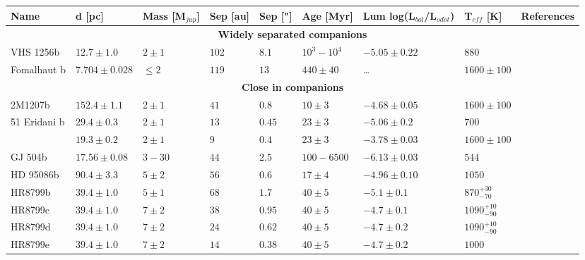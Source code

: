 \begin{landscape}
\begin{table}[t]
	\centering
	\begin{small}
	\begin{tabular}{lllllllll}
		\toprule
		\textbf{Name} & \textbf{d [pc]} & \textbf{Mass [M$_{jup}$]} & \textbf{Sep [au]} & \textbf{Sep ["]} & \textbf{Age [Myr]} & \textbf{Lum log(L$_{bol}$/L$_{odot}$)} & \textbf{T$_{eff}$ [K]} & \textbf{References}\\
		\midrule
		\multicolumn{9}{c}{\textbf{Widely separated companions}}\\
		\midrule
		VHS 1256b & $12.7\pm1.0$  & $2\pm1$     & $102$ & $8.1$ & $10^{3}-10^{4}$ & $-5.05\pm0.22$ & $880$ & \parencite{Gauza2015}\\
		Fomalhaut b & $7.704\pm0.028$ & $\leq 2$ & $119$ & $13$ & $440\pm40$ & \ldots & $1600\pm100$ &\\
		\midrule
		\multicolumn{9}{c}{\textbf{Close in companions}}\\
		\midrule
		2M1207b   & $152.4\pm1.1$ & $2\pm1$     & $41$ & $0.8$ & $10\pm3$ & $-4.68\pm0.05$ & $1600\pm100$ &\\
		51 Eridani b & $29.4\pm0.3$ & $2\pm1$   & $13$ & $0.45$ & $23\pm3$ & $-5.06\pm0.2$ & $700$ &  \parencite{Macintosh2015}\\
		\bpic     & $19.3\pm0.2$  & $2\pm1$     & $9$ & $0.4$ & $23\pm3$ & $-3.78\pm0.03$ & $1600\pm100$ & \parencite{Quanz2010}\\
		GJ 504b   & $17.56\pm0.08$  & $3-30$    & $44$ & $2.5$ & $100-6500$ & $-6.13\pm0.03$ & $544$ & \parencite{Skemer2016}\\
		HD 95086b & $90.4\pm3.3$  & $5\pm2$     & $56$ & $0.6$ & $17\pm4$ & $-4.96\pm0.10$ & $1050$  &\parencite{DeRosa2016}\\	
		HR8799b   & $39.4\pm1.0$  & $5\pm1$     & $68$ & $1.7$ & $40\pm5$ & $-5.1\pm0.1$ & $870^{+30}_{-70}$ & \parencite{Marois2008,Skemer2012}\\
		HR8799c   & $39.4\pm1.0$  & $7\pm2$     & $38$ & $0.95$ & $40\pm5$ & $-4.7\pm0.1$ & $1090^{+10}_{-90}$ &\parencite{Marois2008,Skemer2012}\\
		HR8799d   & $39.4\pm1.0$  & $7\pm2$     & $24$ & $0.62$ & $40\pm5$ & $-4.7\pm0.2$ & $1090^{+10}_{-90}$ &\parencite{Marois2008,Skemer2012}\\
		HR8799e   & $39.4\pm1.0$  & $7\pm2$     & $14$ & $0.38$ & $40\pm5$ & $-4.7\pm0.2$ & $1000$ &\parencite{Marois2008,Skemer2012}\\	

\end{tabular}
\end{small}
\end{table}
\end{landscape}
